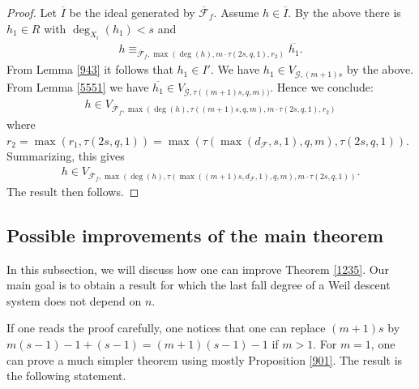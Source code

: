 \documentclass{amsart}
\theoremstyle{plain}
\theoremstyle{definition}
\begin{document}
\begin{proof}
Let $\overline{I}$ be the ideal generated by $\overline{\mathcal{F}}_f$. Assume $h \in \overline{I}$. By the above there is $h_1 \in R$ with $\deg_{X_i}(h_1)<s$ and 
\begin{eqnarray*}
h \equiv_{\overline{\mathcal{F}}_f, \max(\deg(h), m \cdot \tau(2s,q,1),r_2)} \overline{h_1}.
\end{eqnarray*}
From Lemma \ref{943} it follows that $h_1 \in I'$. We have $h_1 \in V_{\mathcal{G},(m+1)s}$ by the above. From Lemma \ref{5551} we have $\overline{h_1} \in V_{\overline{\mathcal{G}},\tau((m+1)s,q,m))}$.
Hence we conclude:
\begin{eqnarray*}
h \in V_{\overline{\mathcal{F}}_f, \max(\deg(h), \tau((m+1)s,q,m), m \cdot \tau(2s,q,1), r_2)}
\end{eqnarray*}
where $r_2=\max(r_1,\tau(2s,q,1))=\max(\tau(\max(d_{\mathcal{F}},s,1),q,m),\tau(2s,q,1))$.
Summarizing, this gives
\begin{eqnarray*}
h \in V_{\overline{\mathcal{F}}_f, \max(\deg(h), \tau(\max((m+1)s, d_{\mathcal{F}},1),q,m),m \cdot \tau(2s,q,1)) }.
\end{eqnarray*}
The result then follows.
\end{proof}

\subsection{Possible improvements of the main theorem}

In this subsection, we will discuss how one can improve Theorem \ref{1235}. Our main goal is to obtain a result for which the last fall degree of a Weil descent system does not depend on $n$.

If one reads the proof carefully, one notices that one can replace $(m+1)s$ by $m(s-1)-1+(s-1)=(m+1)(s-1)-1$ if $m>1$. For $m=1$, one can prove a much simpler theorem using mostly Proposition \ref{901}. The result is the following statement.
\end{document}
